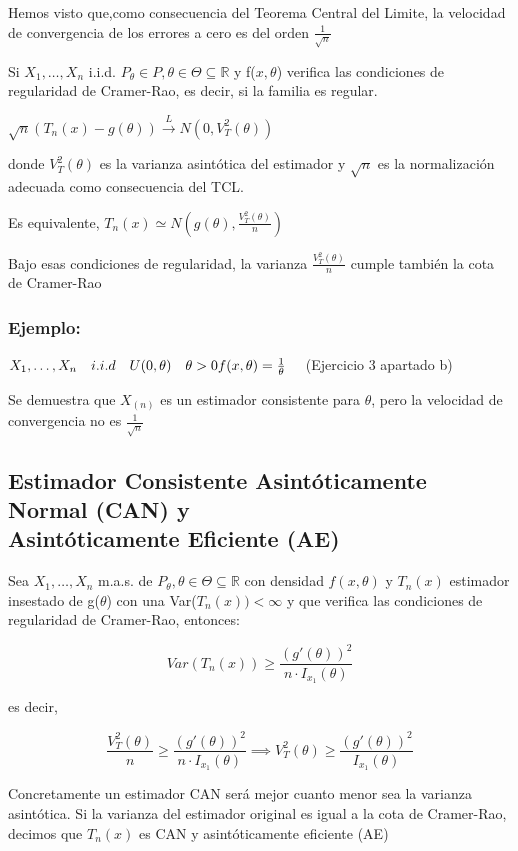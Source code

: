 Hemos visto que,como consecuencia del Teorema Central del Limite,  la velocidad de convergencia de los errores a cero es del orden $\frac{1}{\sqrt{n}}$

Si $X_1,\dots,X_n$ i.i.d. $P_\theta \in P,\theta \in \Theta \subseteq \mathbb{R}$ y f($x,\theta$)
verifica las condiciones de regularidad de Cramer-Rao, es decir, si la familia es regular.

$\sqrt{n}(T_n(x)-g(\theta)) \xrightarrow{L} N(0,V_T^2(\theta))$

donde $V_T^2(\theta)$ es la varianza asintótica del estimador y $\sqrt{n}$ es la normalización
adecuada como consecuencia del TCL.

Es equivalente, $T_n(x) \simeq N(g(\theta),\frac{V_T^2(\theta)}{n})$

Bajo esas condiciones de regularidad, la varianza $\frac{V_T^2(\theta)}{n}$
cumple también la cota de Cramer-Rao

\subsubsection*{Ejemplo:}

\(
X_1,\dots,X_n \quad i.i.d \quad U(0,\theta) \quad \theta>0
\\f(x,\theta)= \frac{1}{\theta} \quad
\)
(Ejercicio 3 apartado b)

Se demuestra que $X_{(n)}$ es un estimador consistente para $\theta$, pero la velocidad de convergencia no es $\frac{1}{\sqrt{n}}$

\subsection{Estimador Consistente Asintóticamente Normal (CAN) y \texorpdfstring{\\}{ } Asintóticamente Eficiente (AE)}

Sea $X_1,\dots,X_n$ m.a.s. de $P_\theta, \theta \in \Theta \subseteq \mathbb{R}$
con densidad $f(x,\theta)$ y $T_n(x)$ estimador insestado de g($\theta$) con una Var($T_n(x))<\infty$
y que verifica las condiciones de regularidad de Cramer-Rao, entonces:

\[
    Var(T_n(x)) \geq \frac{(g'(\theta))^2}{n \cdot I_{x_1}(\theta)}
\]

es decir,

\[
    \frac{V_T^2(\theta)}{n} \geq \frac{(g'(\theta))^2}{n \cdot I_{x_1}(\theta)}
\implies     V_T^2(\theta) \geq \frac{(g'(\theta))^2}{I_{x_1}(\theta)}
\]

Concretamente un estimador CAN será mejor cuanto menor sea la varianza asintótica.
Si la varianza del estimador original es igual a la cota de Cramer-Rao, decimos que $T_n(x)$ es CAN y asintóticamente eficiente (AE)

